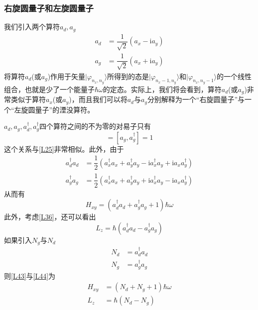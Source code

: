 \documentclass[]{article}
\begin{document}
\subsubsection{右旋圆量子和左旋圆量子}
我们引入两个算符$a_d,a_g$
\begin{align}
	a_d&=\dfrac{1}{\sqrt{2}}(a_x-\mathrm{i}a_y)\nonumber\\
	a_g&=\dfrac{1}{\sqrt{2}}(a_x+\mathrm{i}a_y)
\end{align}
将算符$a_d$(或$a_g$)作用于矢量$|\varphi_{n_x,n_y}\rangle$所得到的态是$|\varphi_{n_x-1,n_y}\rangle$和$|\varphi_{n_x,n_y-1}\rangle$的一个线性组合，也就是少了一个能量子$\hbar\omega$的定态。实际上，我们将会看到，算符$a_d$(或$a_g$)非常类似于算符$a_x$(或$a_y$)，而且我们可以将$a_d$与$a_g$分别解释为一个“右旋圆量子”与一个“左旋圆量子”的湮没算符。\par 
$a_d,a_g,a_d^\dagger,a_g^\dagger$四个算符之间的不为零的对易子只有
\begin{equation}
	[a_d,a_d^\dagger]=[a_g,a_g^\dagger]=1
\end{equation}
这个关系与\eqref{L25}非常相似。此外，由于
\begin{align}
	a_d^\dagger a_d&=\dfrac{1}{2}(a_x^\dagger a_x+a_y^\dagger a_y-\mathrm{i}a_x^\dagger a_y+\mathrm{i}a_xa_y^\dagger)\nonumber\\
	a_g^\dagger a_g&=\dfrac{1}{2}(a_x^\dagger a_x+a_y^\dagger a_y+\mathrm{i}a_x^\dagger a_y-\mathrm{i}a_xa_y^\dagger)
\end{align}
从而有
\begin{equation}
	H_{xy}=(a_d^\dagger a_d+a_g^\dagger a_g+1)\hbar\omega
	\label{L43}
\end{equation}
此外，考虑\eqref{L36}，还可以看出
\begin{equation}
	L_z=\hbar(a_d^\dagger a_d-a_g^\dagger a_g)
	\label{L44}
\end{equation}
如果引入$N_g$与$N_d$
\begin{align}
	N_d&=a_d^\dagger a_d\nonumber\\
	N_g&=a_g^\dagger a_g
\end{align}
则\eqref{L43}与\eqref{L44}为
\begin{align}
	H_{xy}&=(N_d+N_g+1)\hbar\omega\nonumber\\
	L_z&=\hbar(N_d-N_g)
	\label{L4646}
\end{align}
\end{document}
